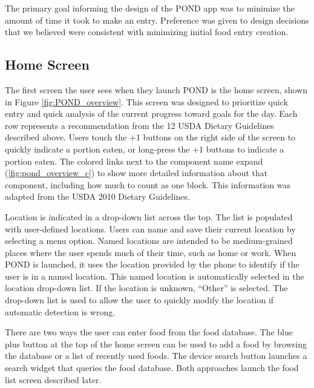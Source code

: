 The primary goal informing the design of the POND app was to minimize the amount of time it took to make an entry. Preference was given to design decisions that we believed were consistent with minimizing initial food entry creation. 

\subsection{Home Screen}
The first screen the user sees when they launch POND is the home screen, shown in Figure \ref{fig:POND_overview}. This screen was designed to prioritize quick entry and quick analysis of the current progress toward goals for the day. Each row represents a recommendation from the 12 USDA Dietary Guidelines described above. Users touch the +1 buttons on the right side of the screen to quickly indicate a portion eaten, or long-press the +1 buttons to indicate a \textonehalf  portion eaten. The colored links next to the component name expand (\ref{fig:pond_overview_c}) to show more detailed information about that component, including how much to count as one block. This information was adapted from the USDA 2010 Dietary Guidelines. 

Location is indicated in a drop-down list across the top. The list is populated with user-defined locations. Users can name and save their current location by selecting a menu option. Named locations are intended to be medium-grained places where the user spends much of their time, such as home or work. When POND is launched, it uses the location provided by the phone to identify if the user is in a named location. This named location is automatically selected in the location drop-down list. If the location is unknown, ``Other'' is selected. The  drop-down list is used to allow the user to quickly modify the location if  automatic detection is wrong. 

There are two ways the user can enter food from the food database. The blue plus button at the top of the home screen can be used to add a food by browsing the database or a list of recently used foods. The device search button launches a search widget that queries the food database. Both approaches launch the food list screen described later. 

